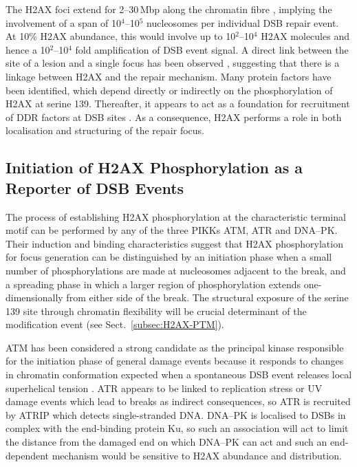 \documentclass[graybox]{svmult}
\begin{document}
The \ugamma H2AX foci extend for 2--30\,Mbp along the chromatin fibre \cite{EPR+99}, implying the
involvement of a span of 10$^4$--10$^5$ nucleosomes per individual DSB repair event. At 10\% H2AX
abundance, this would involve up to 10$^2$--10$^4$ H2AX molecules and hence a 10$^2$--10$^4$ fold
amplification of DSB event signal. A direct link between the site of a lesion and a single focus has
been observed \cite{KRIK+03}, suggesting that there is a linkage between \ugamma H2AX and the repair
mechanism. Many protein factors have been identified, which depend directly or indirectly on the
phosphorylation of H2AX at serine 139. Thereafter, it appears to act as a foundation for recruitment
of DDR factors at DSB sites \cite{TTP+00}. As a consequence, H2AX performs a role in both localisation
and structuring of the repair focus.

\subsection{Initiation of H2AX Phosphorylation as a Reporter of DSB Events}
\label{subsec:H2AX-reporter}
The process of establishing H2AX phosphorylation at the characteristic terminal motif can be performed
by any of the three PIKKs ATM, ATR and DNA--PK\@. Their induction and binding characteristics suggest
that H2AX phosphorylation for focus generation can be distinguished by an initiation phase when a
small number of phosphorylations are made at nucleosomes adjacent to the break, and a spreading phase
in which a larger region of phosphorylation extends one-dimensionally from either side of the break.
The structural exposure of the serine 139 site through chromatin flexibility will be crucial determinant
of the modification event (see Sect.\ \ref{subsec:H2AX-PTM}).

ATM has been considered a strong candidate as the principal kinase responsible for the initiation phase
of general damage events because it responds to changes in chromatin conformation expected when a
spontaneous DSB event releases local superhelical tension \cite{CJB03}. ATR appears to be linked to
replication stress or UV damage events which lead to breaks as indirect consequences, so ATR is recruited
by ATRIP which detects single-stranded DNA\@. DNA--PK is localised to DSBs in complex with the end-binding
protein Ku, so such an association will act to limit the distance from the damaged end on which DNA--PK
can act \cite{WCG01} and such an end-dependent mechanism would be sensitive to H2AX abundance and distribution.
\end{document}
